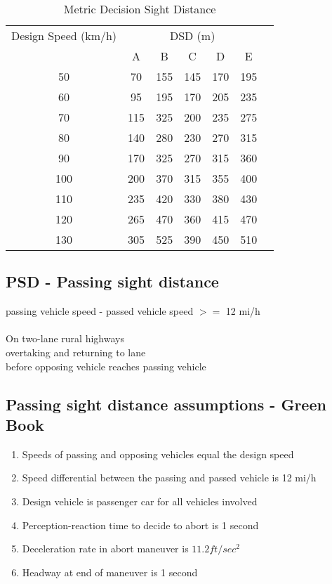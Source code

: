 \documentclass{article}
\begin{document}
  \begin{table}[h!]
  \centering
  \caption{Metric Decision Sight Distance}
  \label{tab:metric_decision_sight_distance}
  \begin{tabular}{ccccccc}
  \toprule
  Design Speed (km/h) & \multicolumn{5}{c}{DSD (m)} \\
  \cmidrule(lr){2-6}
  & A & B & C & D & E \\
  \midrule
  50 & 70 & 155 & 145 & 170 & 195 \\
  60 & 95 & 195 & 170 & 205 & 235 \\
  70 & 115 & 325 & 200 & 235 & 275 \\
  80 & 140 & 280 & 230 & 270 & 315 \\
  90 & 170 & 325 & 270 & 315 & 360 \\
  100 & 200 & 370 & 315 & 355 & 400 \\
  110 & 235 & 420 & 330 & 380 & 430 \\
  120 & 265 & 470 & 360 & 415 & 470 \\
  130 & 305 & 525 & 390 & 450 & 510 \\
  \bottomrule
  \end{tabular}
  \end{table}

  \newpage

  \subsection{PSD - Passing sight distance}
  passing vehicle speed - passed vehicle speed $>=$ 12 mi/h\\
  \\
  On two-lane rural highways\\
  overtaking and returning to lane\\
  before opposing vehicle reaches passing vehicle\\


  \subsection{Passing sight distance assumptions - Green Book}
  \begin{enumerate}
    \item Speeds of passing and opposing vehicles equal the design speed
    \item Speed differential between the passing and passed vehicle is 12 mi/h
    \item Design vehicle is passenger car for all vehicles involved
    \item Perception-reaction time to decide to abort is 1 second
    \item Deceleration rate in abort maneuver is $11.2 ft/sec^2$
    \item Headway at end of maneuver is 1 second
  \end{enumerate}
\end{document}
